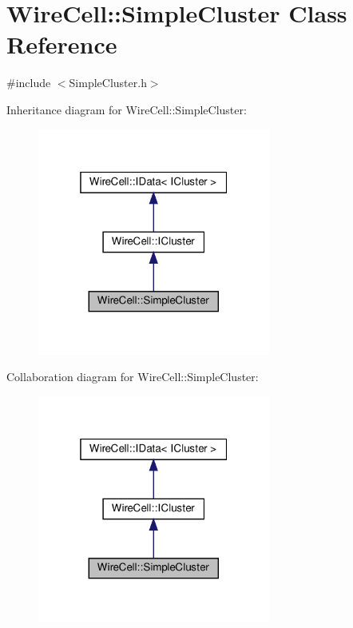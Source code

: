 \hypertarget{class_wire_cell_1_1_simple_cluster}{}\section{Wire\+Cell\+:\+:Simple\+Cluster Class Reference}
\label{class_wire_cell_1_1_simple_cluster}


{\ttfamily \#include $<$Simple\+Cluster.\+h$>$}



Inheritance diagram for Wire\+Cell\+:\+:Simple\+Cluster\+:
\nopagebreak
\begin{figure}[H]
\begin{center}
\leavevmode
\includegraphics[width=217pt]{class_wire_cell_1_1_simple_cluster__inherit__graph}
\end{center}
\end{figure}


Collaboration diagram for Wire\+Cell\+:\+:Simple\+Cluster\+:
\nopagebreak
\begin{figure}[H]
\begin{center}
\leavevmode
\includegraphics[width=217pt]{class_wire_cell_1_1_simple_cluster__coll__graph}
\end{center}
\end{figure}
